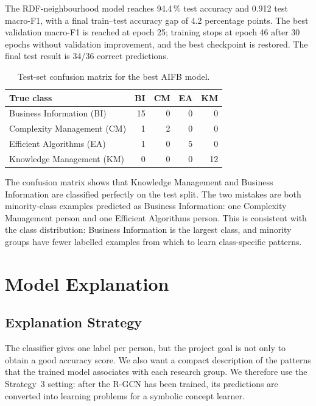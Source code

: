 \documentclass[runningheads]{llncs}
\begin{document}
The RDF-neighbourhood model reaches 94.4\,\% test accuracy and 0.912 test macro-F1, with a final
train--test accuracy gap of 4.2 percentage points.  The best validation macro-F1 is reached at epoch 25;
training stops at epoch 46 after 30 epochs without validation improvement, and the best checkpoint is
restored.  The final test result is 34/36 correct predictions.

\begin{table}[ht]
\centering
\caption{Test-set confusion matrix for the best AIFB model.}
\label{tab:confusion}
\begin{tabular}{lrrrr}
\toprule
\textbf{True class} & \textbf{BI} & \textbf{CM} & \textbf{EA} & \textbf{KM} \\
\midrule
Business Information (BI) & 15 & 0 & 0 & 0 \\
Complexity Management (CM) & 1 & 2 & 0 & 0 \\
Efficient Algorithms (EA) & 1 & 0 & 5 & 0 \\
Knowledge Management (KM) & 0 & 0 & 0 & 12 \\
\bottomrule
\end{tabular}
\end{table}

The confusion matrix shows that Knowledge Management and Business Information are classified perfectly
on the test split.  The two mistakes are both minority-class examples predicted as Business Information:
one Complexity Management person and one Efficient Algorithms person.  This is consistent with the class
distribution: Business Information is the largest class, and minority groups have fewer labelled examples
from which to learn class-specific patterns.

\section{Model Explanation}

\subsection{Explanation Strategy}

The classifier gives one label per person, but the project goal is not only to obtain a good accuracy
score.  We also want a compact description of the patterns that the trained model associates with each
research group.  We therefore use the Strategy~3 setting: after the R-GCN has been trained, its predictions
are converted into learning problems for a symbolic concept learner.
\end{document}
